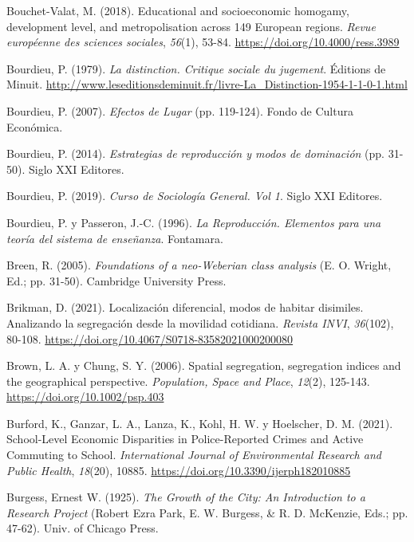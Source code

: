 \documentclass[
  spanish,
  a4paper,%
  chapterprefix=true,%
  DIV=calc,%
  twoside]{scrbook}%
\newlength{\cslhangindent}
\newenvironment{CSLReferences}[2] %
 {\begin{list}{}{%
  \setlength{\itemindent}{0pt}
  \setlength{\leftmargin}{0pt}
  \setlength{\parsep}{0pt}
  \ifodd #1
   \setlength{\leftmargin}{\cslhangindent}
   \setlength{\itemindent}{-1\cslhangindent}
  \fi
  \setlength{\itemsep}{#2\baselineskip}}}
 {\end{list}}
\begin{document}
\begin{CSLReferences}{1}{0}
Bouchet-Valat, M. (2018). Educational and socioeconomic homogamy, development level, and metropolisation across 149 European regions. \emph{Revue européenne des sciences sociales}, \emph{56}(1), 53-84. \url{https://doi.org/10.4000/ress.3989}

Bourdieu, P. (1979). \emph{La distinction. Critique sociale du jugement}. Éditions de Minuit. \url{http://www.leseditionsdeminuit.fr/livre-La_Distinction-1954-1-1-0-1.html}

Bourdieu, P. (2007). \emph{Efectos de Lugar} (pp. 119-124). Fondo de Cultura Económica.

Bourdieu, P. (2014). \emph{Estrategias de reproducción y modos de dominación} (pp. 31-50). Siglo XXI Editores.

Bourdieu, P. (2019). \emph{Curso de Sociología General. Vol 1}. Siglo XXI Editores.

Bourdieu, P. y Passeron, J.-C. (1996). \emph{La Reproducción. Elementos para una teoría del sistema de enseñanza}. Fontamara.

Breen, R. (2005). \emph{Foundations of a neo-Weberian class analysis} (E. O. Wright, Ed.; pp. 31-50). Cambridge University Press.

Brikman, D. (2021). Localización diferencial, modos de habitar disimiles. Analizando la segregación desde la movilidad cotidiana. \emph{Revista INVI}, \emph{36}(102), 80-108. \url{https://doi.org/10.4067/S0718-83582021000200080}

Brown, L. A. y Chung, S. Y. (2006). Spatial segregation, segregation indices and the geographical perspective. \emph{Population, Space and Place}, \emph{12}(2), 125-143. \url{https://doi.org/10.1002/psp.403}

Burford, K., Ganzar, L. A., Lanza, K., Kohl, H. W. y Hoelscher, D. M. (2021). School-Level Economic Disparities in Police-Reported Crimes and Active Commuting to School. \emph{International Journal of Environmental Research and Public Health}, \emph{18}(20), 10885. \url{https://doi.org/10.3390/ijerph182010885}

Burgess, Ernest W. (1925). \emph{The Growth of the City: An Introduction to a Research Project} (Robert Ezra Park, E. W. Burgess, \& R. D. McKenzie, Eds.; pp. 47-62). Univ. of Chicago Press.


\end{CSLReferences}
\end{document}
